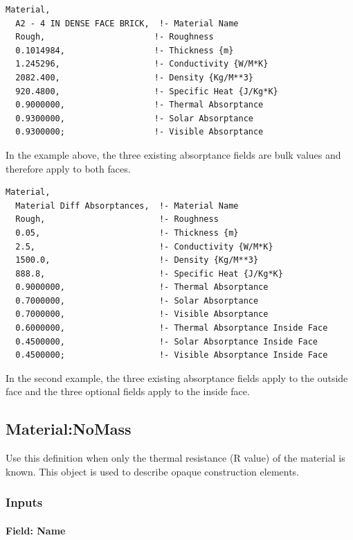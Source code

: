 \begin{lstlisting}
Material,
  A2 - 4 IN DENSE FACE BRICK,  !- Material Name
  Rough,                      !- Roughness
  0.1014984,                  !- Thickness {m}
  1.245296,                   !- Conductivity {W/M*K}
  2082.400,                   !- Density {Kg/M**3}
  920.4800,                   !- Specific Heat {J/Kg*K}
  0.9000000,                  !- Thermal Absorptance
  0.9300000,                  !- Solar Absorptance
  0.9300000;                  !- Visible Absorptance
\end{lstlisting}

In the example above, the three existing absorptance fields are bulk values and therefore apply to both faces.

\begin{lstlisting}
Material,
  Material Diff Absorptances,  !- Material Name
  Rough,                       !- Roughness
  0.05,                        !- Thickness {m}
  2.5,                         !- Conductivity {W/M*K}
  1500.0,                      !- Density {Kg/M**3}
  888.8,                       !- Specific Heat {J/Kg*K}
  0.9000000,                   !- Thermal Absorptance
  0.7000000,                   !- Solar Absorptance
  0.7000000,                   !- Visible Absorptance
  0.6000000,                   !- Thermal Absorptance Inside Face
  0.4500000,                   !- Solar Absorptance Inside Face
  0.4500000;                   !- Visible Absorptance Inside Face
\end{lstlisting}

In the second example, the three existing absorptance fields apply to the outside face and the three optional fields apply to the inside face.

\subsection{Material:NoMass}\label{materialnomass}

Use this definition when only the thermal resistance (R value) of the material is known. This object is used to describe opaque construction elements.

\subsubsection{Inputs}\label{inputs-1-043}

\paragraph{Field: Name}\label{field-name-1-042}

